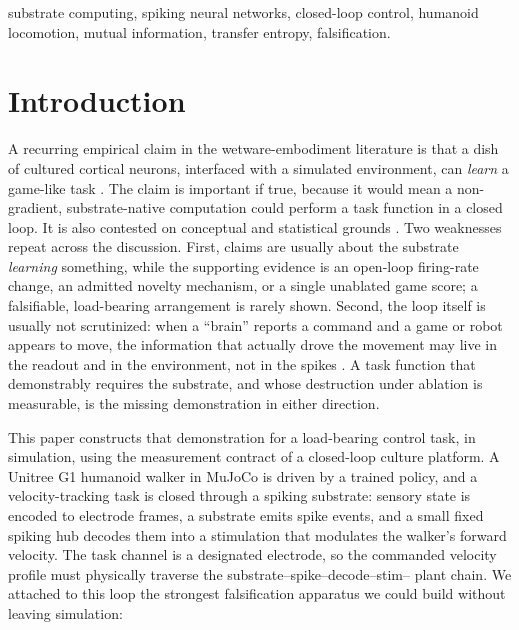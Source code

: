 \begin{IEEEkeywords}
substrate computing, spiking neural networks, closed-loop control, humanoid
locomotion, mutual information, transfer entropy, falsification.
\end{IEEEkeywords}

\section{Introduction}

A recurring empirical claim in the wetware-embodiment literature is that a
dish of cultured cortical neurons, interfaced with a simulated environment,
can \emph{learn} a game-like task
\cite{kagan2022dishbrain}. The claim is important if true, because it would
mean a non-gradient, substrate-native computation could perform a task function
in a closed loop. It is also contested on conceptual and statistical grounds
\cite{balci2023neurons,kagan2023semantics}. Two weaknesses repeat across the
discussion. First, claims are usually about the substrate \emph{learning}
something, while the supporting evidence is an open-loop firing-rate change, an
admitted novelty mechanism, or a single unablated game score; a falsifiable,
load-bearing arrangement is rarely shown. Second, the loop itself is usually
not scrutinized: when a ``brain'' reports a command and a game or robot
appears to move, the information that actually drove the movement may live in
the readout and in the environment, not in the spikes
\cite{maass2002liquid,balci2023neurons}. A task function that demonstrably
requires the
substrate, and whose destruction under ablation is measurable, is the missing
demonstration in either direction.

This paper constructs that demonstration for a load-bearing control task, in
simulation, using the measurement contract of a closed-loop culture platform.
A Unitree G1 humanoid walker in MuJoCo is driven by a trained policy, and a
velocity-tracking task is closed through a spiking substrate: sensory state is
encoded to electrode frames, a substrate emits spike events, and a small fixed
spiking hub decodes them into a stimulation that modulates the walker's
forward velocity. The task channel is a designated electrode, so the commanded
velocity profile must physically traverse the substrate--spike--decode--stim--
plant chain. We attached to this loop the strongest falsification apparatus we
could build without leaving simulation:

